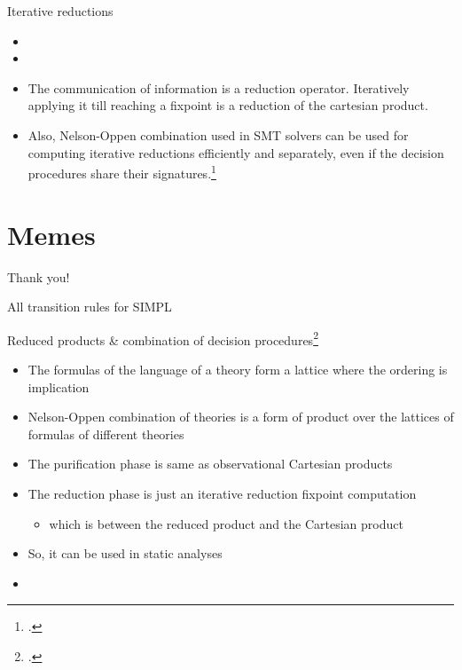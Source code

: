 \documentclass[aspectratio=169,14pt]{beamer}
\begin{document}
\begin{frame}{Iterative reductions}
  \small
  \begin{itemize}
  \item {}
  \item {}
  \item The communication of information is a reduction operator. Iteratively applying it till reaching a fixpoint is a reduction of the cartesian product.
  \item Also, Nelson-Oppen combination used in SMT solvers can be used for computing iterative reductions efficiently and separately, even if the decision procedures share their signatures.\footcite{cousot2011reduced}
  \end{itemize}
\end{frame}

\section{Memes}
\begin{frame}{}\end{frame}

\begin{frame}[standout]
  Thank you!
\end{frame}

\appendix

\begin{frame}{All transition rules for SIMPL}
  \todo{}
\end{frame}

\begin{frame}{Reduced products \& combination of decision procedures\footcite{cousot2011reduced}}
  \footnotesize
  \begin{itemize}
  \item The formulas of the language of a theory form a lattice where the ordering is implication
  \item Nelson-Oppen combination of theories is a form of product over the lattices of formulas of different theories
  \item The purification phase is same as observational Cartesian products
  \item The reduction phase is just an iterative reduction fixpoint computation
    \begin{itemize}
    \item which is between the reduced product and the Cartesian product
    \end{itemize}
  \item So, it can be used in static analyses
  \item {}
  \end{itemize}
\end{frame}
\end{document}
